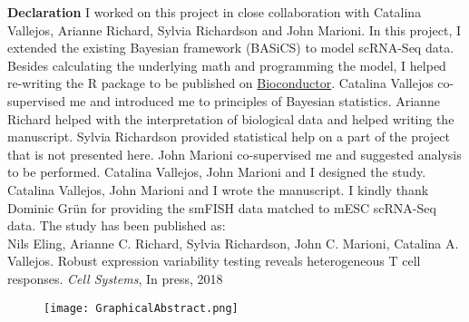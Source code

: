 \begin{Comment}
\textbf{Declaration} I worked on this project in close collaboration with Catalina Vallejos, Arianne Richard, Sylvia Richardson and John Marioni. In this project, I extended the existing Bayesian framework (BASiCS) to model scRNA-Seq data. Besides calculating the underlying math and programming the model, I helped re-writing the R package to be published on \href{https://bioconductor.org/packages/release/bioc/html/BASiCS.html}{Bioconductor}. Catalina Vallejos co-supervised me and introduced me to principles of Bayesian statistics. Arianne Richard helped with the interpretation of biological data and helped writing the manuscript. Sylvia Richardson provided statistical help on a part of the project that is not presented here. John Marioni co-supervised me and suggested analysis to be performed. Catalina Vallejos, John Marioni and I designed the study. Catalina Vallejos, John Marioni and I wrote the manuscript. I kindly thank Dominic Gr\"un for providing the smFISH data matched to mESC scRNA-Seq data. The study has been published as:\\

Nils Eling, Arianne C. Richard, Sylvia Richardson, John C. Marioni, Catalina A. Vallejos. Robust expression variability testing reveals heterogeneous T cell responses. \emph{Cell Systems}, In press, 2018 
\end{Comment}

\begin{figure}[hb]
\centering    
\texttt{[image: GraphicalAbstract.png]}
\end{figure}

\newpage


\newpage

\newpage



